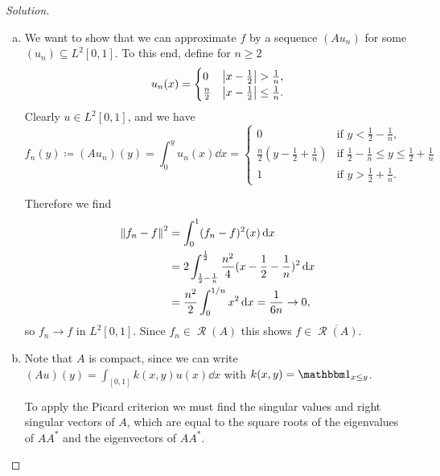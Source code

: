 \documentclass{article}
\theoremstyle{plain}
\theoremstyle{remark}
\newenvironment{solution}{\begin{proof}[Solution]\renewcommand\qedsymbol{}}{\end{proof}}
\newcommand{\Bb}{\mathbb}
\newcommand{\Cal}{\mathcal}
\newcommand{\NN}{\Bb N}
\newcommand\ceq\coloneqq %
\newcommand\ind{\mathbbm 1} %
\newcommand\clos\overline
\DeclareMathOperator\Ran{\Cal R}
\begin{document}
\begin{solution}
	\begin{enumerate}[(a)]
		\item We want to show that we can approximate $f$ by a sequence $(Au_n)$ for some $(u_n) \subseteq L^2[0,1]$. To this end, define for $n \geq 2$
		\[
		u_n(x) =
		\begin{cases}
			0 &\abs{x - \frac12} > \frac1n, \\
			\frac n2 &\abs{x - \frac12} \leq \frac1n. 
		\end{cases}
		\]
		Clearly $u \in L^2[0, 1]$, and we have
		\[
		f_n(y) \ceq (Au_n)(y) = \int_0^y u_n(x) \dd{x} = \begin{cases}
			0 &\text{if $y < \frac12 - \frac1n$,}\\
			\frac n2(y - \frac12 + \frac1n) &\text{if $\frac12 - \frac1n \leq y \leq \frac12 + \frac1n$} \\
			1 &\text{if $y > \frac12 + \frac1n$}. 
		\end{cases}
		\]
		
		Therefore we find
		\begin{align*}
			\norm{f_n - f}^2 &= \int_0^1 (f_n - f)^2(x) \dd{x} \\
			&= 2 \int_{\frac12 - \frac1n}^{\frac12} \frac{n^2}{4} (x - \frac12 - \frac1n)^2 \dd{x} \\
			&= \frac{n^2}{2} \int_0^{1/n}  x^2 \dd{x} = \frac{1}{6n} \to 0, 
		\end{align*}
	so $f_n \to f$ in $L^2[0, 1]$. Since $f_n \in \Ran(A)$ this shows $f \in \clos{\Ran(A)}$. 
	
	\item 	Note that $A$ is compact, since we can write $(Au)(y) = \int_{[0, 1]} k(x, y) u(x) \dd{x}$ with $k(x, y) = \ind_{x \leq y}$. 
	
	To apply the Picard criterion we must find the singular values and right singular vectors of $A$, which are equal to the square roots of the eigenvalues of $AA^*$ and the eigenvectors of $AA^*$. 
	


\end{enumerate}
\end{solution}
\end{document}
